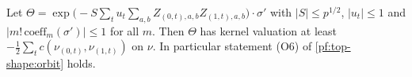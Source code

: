 \begin{proposition}\label{pf:top-shape:o6}
Let $\Theta=\exp\bigl(-S\sum_tu_t\sum_{a,b}Z_{(0,t),a,b}Z_{(1,t),a,b}\bigr)\cdot\sigma'$ with $|S|\le p^{1/2}$, $|u_t|\le1$ and
$|m!\,\mathrm{coeff}_m(\sigma')|\le1$ for all $m$. Then $\Theta$ has kernel valuation at least
$-\frac12\sum_tc(\nu_{(0,t)},\nu_{(1,t)})$ on $\nu$. In particular statement (O6) of \cref{pf:top-shape:orbit} holds.
\end{proposition}


